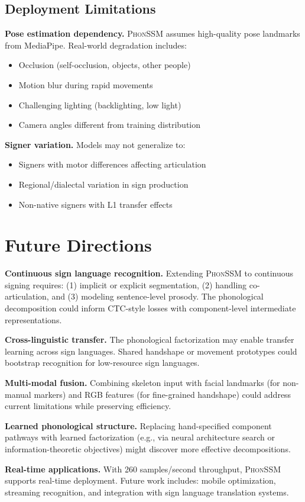 \documentclass[sigconf,nonacm,anonymous]{acmart}
\theoremstyle{definition}
\theoremstyle{remark}
\newcommand{\phonssm}{\textsc{PhonSSM}}
\begin{document}
\subsection{Deployment Limitations}

\textbf{Pose estimation dependency.} \phonssm{} assumes high-quality pose landmarks from MediaPipe. Real-world degradation includes:
\begin{itemize}[nosep,topsep=2pt,leftmargin=*]
\item Occlusion (self-occlusion, objects, other people)
\item Motion blur during rapid movements
\item Challenging lighting (backlighting, low light)
\item Camera angles different from training distribution
\end{itemize}

\textbf{Signer variation.} Models may not generalize to:
\begin{itemize}[nosep,topsep=2pt,leftmargin=*]
\item Signers with motor differences affecting articulation
\item Regional/dialectal variation in sign production
\item Non-native signers with L1 transfer effects
\end{itemize}

\section{Future Directions}
\label{app:future}

\textbf{Continuous sign language recognition.} Extending \phonssm{} to continuous signing requires: (1) implicit or explicit segmentation, (2) handling co-articulation, and (3) modeling sentence-level prosody. The phonological decomposition could inform CTC-style losses with component-level intermediate representations.

\textbf{Cross-linguistic transfer.} The phonological factorization may enable transfer learning across sign languages. Shared handshape or movement prototypes could bootstrap recognition for low-resource sign languages.

\textbf{Multi-modal fusion.} Combining skeleton input with facial landmarks (for non-manual markers) and RGB features (for fine-grained handshape) could address current limitations while preserving efficiency.

\textbf{Learned phonological structure.} Replacing hand-specified component pathways with learned factorization (e.g., via neural architecture search or information-theoretic objectives) might discover more effective decompositions.

\textbf{Real-time applications.} With 260 samples/second throughput, \phonssm{} supports real-time deployment. Future work includes: mobile optimization, streaming recognition, and integration with sign language translation systems.
\end{document}
